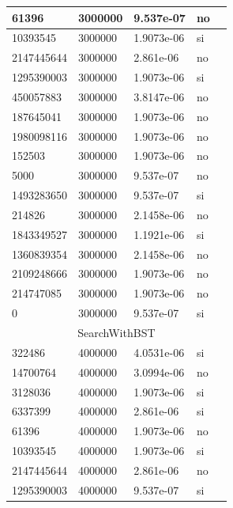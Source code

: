 \documentclass[12pt, fleqn]{article}                             %
\theoremstyle{break}                                            %
\begin{document}
\begin{longtable}{|m{5em}|m{5em}|m{10em}|m{5em}|@{}m{0pt}@{}}
            61396& 3000000  & 9.537e-07 & no &\\[1em]    \hline
            10393545& 3000000  & 1.9073e-06 & si &\\[1em]    \hline
            2147445644& 3000000  & 2.861e-06 & no &\\[1em]    \hline
            1295390003& 3000000  & 1.9073e-06 & si &\\[1em]    \hline
            450057883& 3000000  & 3.8147e-06 & no &\\[1em]    \hline
            187645041& 3000000  & 1.9073e-06 & no &\\[1em]    \hline
            1980098116& 3000000  & 1.9073e-06 & no &\\[1em]    \hline
            152503& 3000000  & 1.9073e-06 & no &\\[1em]    \hline
            5000& 3000000  & 9.537e-07 & no &\\[1em]    \hline
            1493283650& 3000000  & 9.537e-07 & si &\\[1em]    \hline
            214826& 3000000  & 2.1458e-06 & no &\\[1em]    \hline
            1843349527& 3000000  & 1.1921e-06 & si &\\[1em]    \hline
            1360839354& 3000000  & 2.1458e-06 & no &\\[1em]    \hline
            2109248666& 3000000  & 1.9073e-06 & no &\\[1em]    \hline
            214747085& 3000000  & 1.9073e-06 & no &\\[1em]    \hline
            0& 3000000  & 9.537e-07 & si &\\[1em]    \hline
            \multicolumn{5}{|c|}{SearchWithBST}   \\          \hline
            322486& 4000000  & 4.0531e-06 & si &\\[1em]    \hline
            14700764& 4000000  & 3.0994e-06 & no &\\[1em]    \hline
            3128036& 4000000  & 1.9073e-06 & si &\\[1em]    \hline
            6337399& 4000000  & 2.861e-06 & si &\\[1em]    \hline
            61396& 4000000  & 1.9073e-06 & no &\\[1em]    \hline
            10393545& 4000000  & 1.9073e-06 & si &\\[1em]    \hline
            2147445644& 4000000  & 2.861e-06 & no &\\[1em]    \hline
            1295390003& 4000000  & 9.537e-07 & si &\\[1em]    \hline

\end{longtable}
\end{document}
